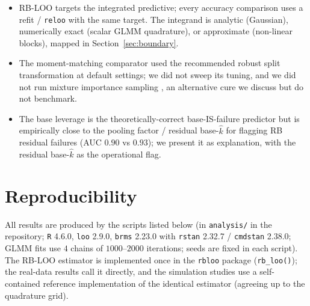 \documentclass[11pt]{article}
\newcommand{\khat}{\hat{k}}
\begin{document}
\begin{itemize}
effective sample size.
\item RB-LOO targets the integrated predictive; every accuracy comparison uses a
refit / \texttt{reloo} with the same target. The integrand is analytic (Gaussian),
numerically exact (scalar GLMM quadrature), or approximate (non-linear blocks),
mapped in Section~\ref{sec:boundary}.
\item The moment-matching comparator used the recommended robust split
transformation at default settings; we did not sweep its tuning, and we did not run
mixture importance sampling \citep{silva2024robust}, an alternative cure we discuss
but do not benchmark.
\item The base leverage is the theoretically-correct base-IS-failure predictor but
is empirically close to the pooling factor / residual base-$\khat$ for flagging RB
residual failures (AUC $0.90$ vs $0.93$); we present it as explanation, with the
residual base-$\khat$ as the operational flag.
\end{itemize}

\section*{Reproducibility}
All results are produced by the scripts listed below (in \texttt{analysis/} in the
repository; \texttt{R} 4.6.0, \texttt{loo}
2.9.0, \texttt{brms} 2.23.0 with \texttt{rstan} 2.32.7 / \texttt{cmdstan} 2.38.0;
GLMM fits use $4$ chains of $1000$--$2000$ iterations; seeds are fixed in each
script). The RB-LOO estimator is implemented once in the \texttt{rbloo} package
(\texttt{rb\_loo()}); the real-data results call it directly, and the simulation
studies use a self-contained reference implementation of the identical estimator
(agreeing up to the quadrature grid).
\end{document}
